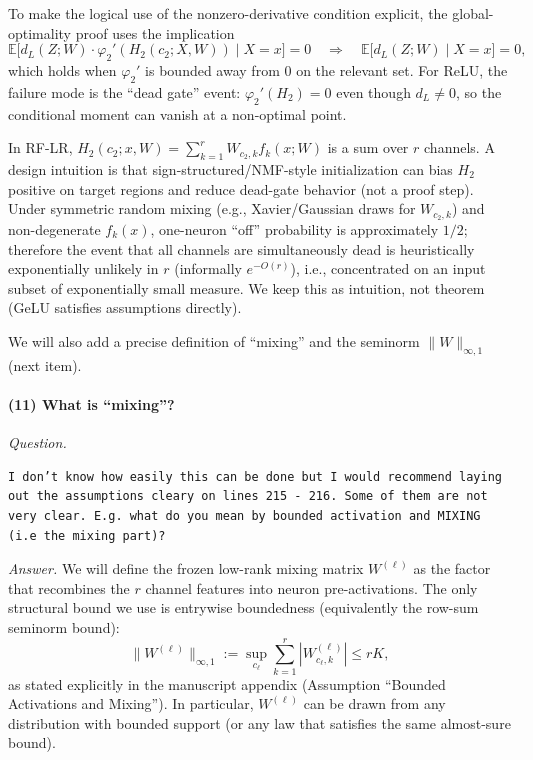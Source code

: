 \documentclass[11pt,a4paper]{article}
\begin{document}
To make the logical use of the nonzero-derivative condition explicit, the global-optimality proof uses the implication
\[
\mathbb{E}\big[d_L(Z;W)\cdot \varphi_2'(H_2(c_2;X,W))\mid X=x\big]=0
\quad\Longrightarrow\quad
\mathbb{E}\big[d_L(Z;W)\mid X=x\big]=0,
\]
which holds when $\varphi_2'$ is bounded away from $0$ on the relevant set. For ReLU, the failure mode is the ``dead gate'' event: $\varphi_2'(H_2)=0$ even though $d_L\neq 0$, so the conditional moment can vanish at a non-optimal point.

In RF-LR, $H_2(c_2;x,W)=\sum_{k=1}^r W_{c_2,k}f_k(x;W)$ is a sum over $r$ channels. A design intuition is that sign-structured/NMF-style initialization can bias $H_2$ positive on target regions and reduce dead-gate behavior (not a proof step). Under symmetric random mixing (e.g., Xavier/Gaussian draws for $W_{c_2,k}$) and non-degenerate $f_k(x)$, one-neuron ``off'' probability is approximately $1/2$; therefore the event that all channels are simultaneously dead is heuristically exponentially unlikely in $r$ (informally $e^{-O(r)}$), i.e., concentrated on an input subset of exponentially small measure. We keep this as intuition, not theorem (GeLU satisfies assumptions directly).

We will also add a precise definition of ``mixing'' and the seminorm $\|W\|_{\infty,1}$ (next item).

\paragraph{(11) What is ``mixing''?}
\textit{Question.}\par
\begin{verbatim}
I don’t know how easily this can be done but I would recommend laying out the assumptions cleary on lines 215 - 216. Some of them are not very clear. E.g. what do you mean by bounded activation and MIXING (i.e the mixing part)?
\end{verbatim}
\textit{Answer.} We will define the frozen low-rank mixing matrix $W^{(\ell)}$ as the factor that recombines the $r$ channel features into neuron pre-activations. The only structural bound we use is entrywise boundedness (equivalently the row-sum seminorm bound):
\[
\|W^{(\ell)}\|_{\infty,1}:=\sup_{c_\ell}\sum_{k=1}^r |W^{(\ell)}_{c_\ell,k}|\le rK,
\]
as stated explicitly in the manuscript appendix (Assumption ``Bounded Activations and Mixing''). In particular, $W^{(\ell)}$ can be drawn from any distribution with bounded support (or any law that satisfies the same almost-sure bound).
\end{document}
